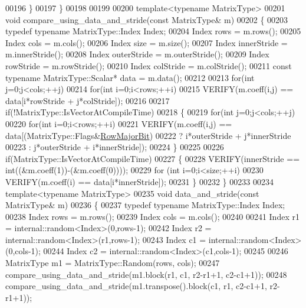 \begin{DoxyCode}
00196   \}
00197 \}
00198 
00199 
00200 \textcolor{keyword}{template}<\textcolor{keyword}{typename} MatrixType>
00201 \textcolor{keywordtype}{void} compare\_using\_data\_and\_stride(\textcolor{keyword}{const} MatrixType& m)
00202 \{
00203   \textcolor{keyword}{typedef} \textcolor{keyword}{typename} MatrixType::Index Index;
00204   Index rows = m.rows();
00205   Index cols = m.cols();
00206   Index size = m.size();
00207   Index innerStride = m.innerStride();
00208   Index outerStride = m.outerStride();
00209   Index rowStride = m.rowStride();
00210   Index colStride = m.colStride();
00211   \textcolor{keyword}{const} \textcolor{keyword}{typename} MatrixType::Scalar* data = m.data();
00212 
00213   \textcolor{keywordflow}{for}(\textcolor{keywordtype}{int} j=0;j<cols;++j)
00214     \textcolor{keywordflow}{for}(\textcolor{keywordtype}{int} i=0;i<rows;++i)
00215       VERIFY(m.coeff(i,j) == data[i*rowStride + j*colStride]);
00216 
00217   \textcolor{keywordflow}{if}(!MatrixType::IsVectorAtCompileTime)
00218   \{
00219     \textcolor{keywordflow}{for}(\textcolor{keywordtype}{int} j=0;j<cols;++j)
00220       \textcolor{keywordflow}{for}(\textcolor{keywordtype}{int} i=0;i<rows;++i)
00221         VERIFY(m.coeff(i,j) == data[(MatrixType::Flags&\hyperlink{group__flags_gae4f56c2a60bbe4bd2e44c5b19cbe8762}{RowMajorBit})
00222                                      ? i*outerStride + j*innerStride
00223                                      : j*outerStride + i*innerStride]);
00224   \}
00225 
00226   \textcolor{keywordflow}{if}(MatrixType::IsVectorAtCompileTime)
00227   \{
00228     VERIFY(innerStride == \textcolor{keywordtype}{int}((&m.coeff(1))-(&m.coeff(0))));
00229     \textcolor{keywordflow}{for} (\textcolor{keywordtype}{int} i=0;i<size;++i)
00230       VERIFY(m.coeff(i) == data[i*innerStride]);
00231   \}
00232 \}
00233 
00234 \textcolor{keyword}{template}<\textcolor{keyword}{typename} MatrixType>
00235 \textcolor{keywordtype}{void} data\_and\_stride(\textcolor{keyword}{const} MatrixType& m)
00236 \{
00237   \textcolor{keyword}{typedef} \textcolor{keyword}{typename} MatrixType::Index Index;
00238   Index rows = m.rows();
00239   Index cols = m.cols();
00240 
00241   Index r1 = internal::random<Index>(0,rows-1);
00242   Index r2 = internal::random<Index>(r1,rows-1);
00243   Index c1 = internal::random<Index>(0,cols-1);
00244   Index c2 = internal::random<Index>(c1,cols-1);
00245 
00246   MatrixType m1 = MatrixType::Random(rows, cols);
00247   compare\_using\_data\_and\_stride(m1.block(r1, c1, r2-r1+1, c2-c1+1));
00248   compare\_using\_data\_and\_stride(m1.transpose().block(c1, r1, c2-c1+1, r2-r1+1));

\end{DoxyCode}
